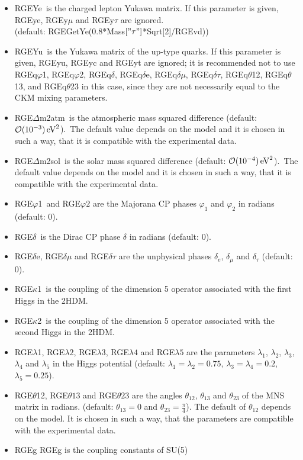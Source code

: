 \documentclass[10pt,a4paper,twoside]{scrartcl}
\begin{document}
\begin{itemize}
\item RGEYe\ is the charged lepton Yukawa matrix.
  If this parameter is given, RGEye, RGEy$\mu$ and RGEy$\tau$ are
  ignored.
    \\ (default:
  RGEGetYe(0.8*Mass$\left[\mathrm{"}\tau\mathrm{"}\right]$*Sqrt[2]/RGEvd))
  
\item RGEYu\ is the Yukawa matrix of the up-type quarks.
  If this parameter is given, RGEyu, RGEyc and RGEyt are ignored;
  it is recommended not to use RGEq$\varphi$1, RGEq$\varphi$2,
  RGEq$\delta$, RGEq$\delta$e, RGEq$\delta\mu$, RGEq$\delta\tau$,
  RGEq$\theta$12, RGEq$\theta$13, and RGEq$\theta$23 in this case, since
  they are not necessarily equal to the CKM mixing parameters.
\item RGE$\Delta$m2atm\ is the atmospheric mass squared difference (default: $ \mathcal{O}(10^{-3}) \,\mathrm{eV}^2$).\ The default value depends on the
  model and it is chosen in such a way, that it is compatible with the
  experimental data.
  
\item RGE$\Delta$m2sol\ is the solar mass squared difference (default:
  $\mathcal{O}(10^{-4}) \,\mathrm{eV}^2$).\ The default value depends on the
  model and it is chosen in such a way, that it is compatible with the
  experimental data.
\item RGE$\varphi$1\ and RGE$\varphi2$ are the Majorana CP phases $\varphi_1$ and $\varphi_2$ in radians (default: $0$).
  
\item RGE$\delta$\ is the Dirac CP phase $\delta$ in radians (default: $0$).
\item RGE$\delta$e, RGE$\delta\mu$ and RGE$\delta\tau$ are the unphysical phases $\delta_e$,
  $\delta_\mu$ and $\delta_\tau$ (default: $0$). 
\item RGE$\kappa$1\ is the coupling of the dimension 5 operator associated
  with the first Higgs in the 2HDM.
  
\item RGE$\kappa$2\ is the coupling of the dimension 5 operator associated
  with the second Higgs in the 2HDM.
  
\item RGE$\lambda$1, RGE$\lambda2$, RGE$\lambda3$, RGE$\lambda4$ and RGE$\lambda5$ are the parameters
$\lambda_1$, $\lambda_2$, $\lambda_3$, $\lambda_4$ and $\lambda_5$ in the Higgs potential
(default: $\lambda_1=\lambda_2=0.75$, $\lambda_3=\lambda_4=0.2$, $\lambda_5=0.25$).
\item RGE$\theta$12, RGE$\theta13$ and RGE$\theta23$ are the angles $\theta_{12}$, $\theta_{13}$
and $\theta_{23}$ of the MNS matrix in radians. (default: $\theta_{13}=0$ and
$\theta_{23}=\frac{\pi}{4}$). The default of $\theta_{12}$ depends on the
model. It is chosen in such a way, that the parameters are compatible with the
experimental data. 
\item RGEg RGEg is the coupling constants of SU(5)
  

\end{itemize}
\end{document}
